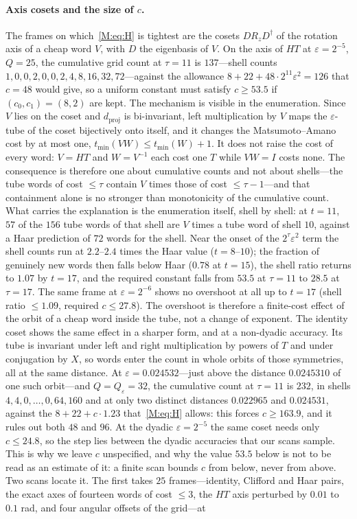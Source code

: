 \documentclass[aps,prx,twocolumn,superscriptaddress,nofootinbib,longbibliography]{revtex4-2}
\theoremstyle{plain}
\theoremstyle{definition}
\theoremstyle{remark}
\newcommand{\dproj}{d_{\mathrm{proj}}}
\begin{document}
\paragraph{Axis cosets and the size of $c$.} The frames on which~\eqref{M:eq:H} is tightest are the cosets $DR_zD^\dagger$ of the rotation axis of a cheap word $V$, with $D$ the eigenbasis of $V$. On the axis of $HT$ at $\varepsilon=2^{-5}$, $Q=25$, the cumulative grid count at $\tau=11$ is $137$---shell counts $1,0,0,2,0,0,2,4,8,16,32,72$---against the allowance $8+22+48\cdot2^{11}\varepsilon^2=126$ that $c=48$ would give, so a uniform constant must satisfy $c\ge53.5$ if $(c_0,c_1)=(8,2)$ are kept. The mechanism is visible in the enumeration. Since $V$ lies on the coset and $\dproj$ is bi-invariant, left multiplication by $V$ maps the $\varepsilon$-tube of the coset bijectively onto itself, and it changes the Matsumoto--Amano cost by at most one, $t_{\min}(VW)\le t_{\min}(W)+1$. It does not raise the cost of every word: $V=HT$ and $W=V^{-1}$ each cost one $T$ while $VW=I$ costs none. The consequence is therefore one about cumulative counts and not about shells---the tube words of cost $\le\tau$ contain $V$ times those of cost $\le\tau-1$---and that containment alone is no stronger than monotonicity of the cumulative count. What carries the explanation is the enumeration itself, shell by shell: at $t=11$, $57$ of the $156$ tube words of that shell are $V$ times a tube word of shell $10$, against a Haar prediction of $72$ words for the shell. Near the onset of the $2^\tau\varepsilon^2$ term the shell counts run at $2.2$--$2.4$ times the Haar value ($t=8$--$10$); the fraction of genuinely new words then falls below Haar ($0.78$ at $t=15$), the shell ratio returns to $1.07$ by $t=17$, and the required constant falls from $53.5$ at $\tau=11$ to $28.5$ at $\tau=17$. The same frame at $\varepsilon=2^{-6}$ shows no overshoot at all up to $t=17$ (shell ratio $\le1.09$, required $c\le27.8$). The overshoot is therefore a finite-cost effect of the orbit of a cheap word inside the tube, not a change of exponent. The identity coset shows the same effect in a sharper form, and at a non-dyadic accuracy. Its tube is invariant under left and right multiplication by powers of $T$ and under conjugation by $X$, so words enter the count in whole orbits of those symmetries, all at the same distance. At $\varepsilon=0.024532$---just above the distance $0.0245310$ of one such orbit---and $Q=Q_\varepsilon=32$, the cumulative count at $\tau=11$ is $232$, in shells $4,4,0,\dots,0,64,160$ and at only two distinct distances $0.022965$ and $0.024531$, against the $8+22+c\cdot1.23$ that~\eqref{M:eq:H} allows: this forces $c\ge163.9$, and it rules out both $48$ and $96$. At the dyadic $\varepsilon=2^{-5}$ the same coset needs only $c\le24.8$, so the step lies between the dyadic accuracies that our scans sample. This is why we leave $c$ unspecified, and why the value $53.5$ below is not to be read as an estimate of it: a finite scan bounds $c$ from below, never from above. Two scans locate it. The first takes $25$ frames---identity, Clifford and Haar pairs, the exact axes of fourteen words of cost $\le3$, the $HT$ axis perturbed by $0.01$ to $0.1$ rad, and four angular offsets of the grid---at 
\end{document}
